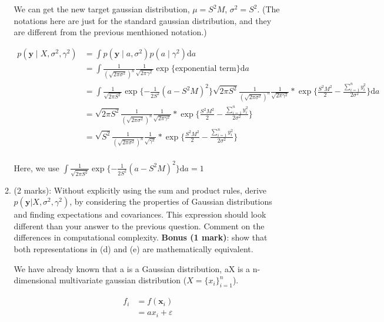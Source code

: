 \documentclass[11pt]{article}
\newcommand{\mbf}[1]{{\boldsymbol{\mathbf{#1}}}}
\renewcommand{\bm}{\mbf}
\begin{document}
\begin{enumerate}
\begin{enumerate}[label=(\alph*)]
We can get the new target gaussian distribution,  $\mu = S^2M$, $\sigma^{2} = S^2$. (The notations here are just for the standard gaussian distribution, and they are different from the previous menthioned notation.)

$$
\begin{aligned}
p(\mathbf{y} \mid X, \sigma^2, \gamma^2)
&=\int p(\mathbf{y} \mid {a}, \sigma^2) p({a} \mid \gamma^2) \mathrm{d} a \\
&=\int \frac{1}{(\sqrt{2\pi \sigma^2})^n} \frac{1}{\sqrt{2\pi \gamma^2}} \exp\{\text{exponential term}\} \mathrm{d} a \\
&=\int \frac{1}{\sqrt{2\pi S^2}} \exp\{-\frac{1}{2S^2} (a-S^2M)^2\}  \sqrt{2\pi S^2} \frac{1}{(\sqrt{2\pi \sigma^2})^n} \frac{1}{\sqrt{2\pi \gamma^2}} * \exp \{\frac{S^2M^2}{2} - \frac{\sum_{i=1}^{n}{y_i^2}}{2\sigma^2}\}\mathrm{d} a \\
&= \sqrt{2\pi S^2} \frac{1}{(\sqrt{2\pi \sigma^2})^n} \frac{1}{\sqrt{2\pi \gamma^2}} * \exp \{\frac{S^2M^2}{2} - \frac{\sum_{i=1}^{n}{y_i^2}}{2\sigma^2}\} \\
&= \sqrt{ S^2} \frac{1}{(\sqrt{2\pi \sigma^2})^n} \frac{1}{\sqrt{\gamma^2}} * \exp \{\frac{S^2M^2}{2} - \frac{\sum_{i=1}^{n}{y_i^2}}{2\sigma^2}\} \\
\end{aligned}
$$






Here, we use $\int \frac{1}{\sqrt{2\pi S^2}} \exp\{-\frac{1}{2S^2} (a-S^2M)^2\} \mathrm{d} a = 1 $




\item (2 marks): Without explicitly using the sum and product rules, derive $p(\bm{y} | X, \sigma^2, \gamma^2)$, by considering 
the properties of Gaussian distributions and finding expectations and covariances.  This expression should look different
than your answer to the previous question.  Comment on the differences in computational complexity.  \textbf{Bonus (1 mark)}:
show that both representations in (d) and (e) are mathematically equivalent.

We have already known that a is a Gaussian distribution, aX is a n-dimensional multivariate gaussian distribution ($X = \{x_i\}_{i=1}^{n}$). 

$$
\begin{aligned}
f_{i}&=f\left(\mathbf{x}_{i}\right)\\
&=ax_i+\varepsilon
\end{aligned}
$$


\end{enumerate}
\end{enumerate}
\end{document}

